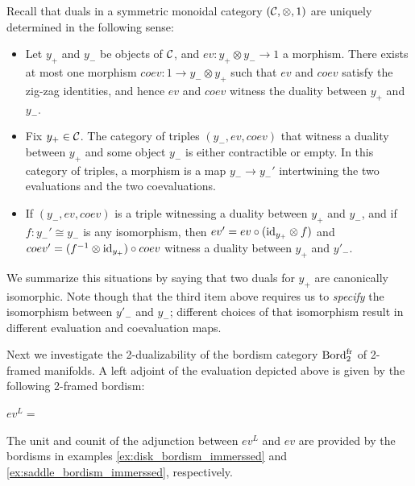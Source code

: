 \documentclass{amsart}
\begin{document}
\begin{remark}
Recall that duals in a symmetric monoidal category $(\mathcal C, \otimes, 1)$ are uniquely determined in the following sense:
\begin{itemize}
	\item Let $y_+$ and $ y_-$ be objects of $\mathcal C$, and $ev: y_+ \otimes y_- \to 1$ a morphism.  There exists at most one morphism $coev: 1 \to y_- \otimes y_+$ such that $ev$ and  $coev$ satisfy the zig-zag identities, and hence $ev$ and $coev$ witness the duality between $y_+$ and $y_-$.
	\item Fix $y_+ \in \mathcal C$. The category of triples $(y_-, ev, coev)$ that witness a duality between $y_+$ and some object $y_-$ is either contractible or empty.  In this category of triples, a morphism is a map $y_- \to y_-'$ intertwining the two evaluations and the two coevaluations.  
	\item If $(y_-, ev, coev)$ is a triple witnessing a duality between $y_+$ and $y_-$, and if $f:y_-' \cong y_-$ is any isomorphism, then $ev' = ev \circ (\mathrm{id}_{y_+} \otimes f)$ and $coev' = (f^{-1} \otimes \mathrm{id}_{y_+}) \circ coev$ witness a duality between $y_+$ and $y'_-$.  
\end{itemize}
We summarize this situations by saying that two duals for $y_+$ are canonically isomorphic.  Note though that the third item above requires us to {\em specify} the isomorphism between $y'_-$ and $y_-$; different choices of that isomorphism result in different evaluation and coevaluation maps.
\end{remark}

Next we investigate the 2-dualizability of the bordism category $\mathrm{Bord}^\mathrm{fr}_2$ of 2-framed manifolds.  A left adjoint of the evaluation depicted above is given by the following 2-framed bordism:
\begin{center}
	$ev^L = $ 
\end{center}
The unit and counit of the adjunction between $ev^L$ and $ev$ are provided by the bordisms in examples \ref{ex:disk_bordism_immerssed} and \ref{ex:saddle_bordism_immerssed}, respectively. 
\end{document}
